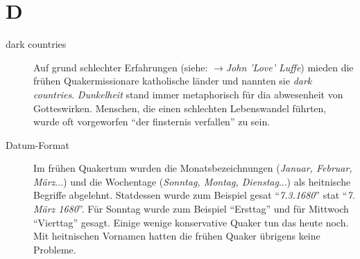 \section*{D}

\articlesize

\begin{description}

 \item[dark countries] Auf grund schlechter Erfahrungen (siehe: $\to$\textit{John
 'Love' Luffe}) mieden die frühen Quakermissionare katholische länder und nannten sie
 \textit{dark countries}. \textit{Dunkelheit} stand immer metaphorisch für dia
 abwesenheit von Gotteswirken. Menschen, die einen schlechten Lebenswandel führten,
 wurde oft vorgeworfen "`der finsternis verfallen"' zu sein. 

\item[Datum-Format] Im frühen Quakertum wurden die Monatsbezeichnungen
(\textit{Januar, Februar, März}...) und die Wochentage (\textit{Sonntag,
Montag, Dienstag}...) als heitnische Begriffe abgelehnt. Statdessen wurde zum
Beispiel gesat "`\textit{7.3.1680}"' stat "`\textit{7. März 1680}"'. Für
Sonntag wurde zum Beispiel "`Ersttag"' und für Mittwoch "`Vierttag"' gesagt.
Einige wenige konservative Quaker tun das heute noch. Mit heitnischen Vornamen
hatten die frühen Quaker übrigens keine Probleme.



\end{description}
